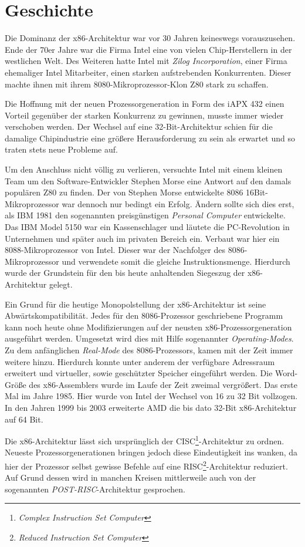 \section{Geschichte}

Die Dominanz der x86-Architektur war vor 30 Jahren keineswegs vorauszusehen.
Ende der 70er Jahre war die Firma Intel eine von vielen Chip-Herstellern in der westlichen Welt.
Des Weiteren hatte Intel mit \emph{Zilog Incorporation}, einer Firma ehemaliger Intel Mitarbeiter, einen starken aufstrebenden Konkurrenten.
Dieser machte ihnen mit ihrem 8080-Mikroprozessor-Klon Z80 stark zu schaffen.

Die Hoffnung mit der neuen Prozessorgeneration in Form des iAPX 432 einen Vorteil gegenüber der starken Konkurrenz zu gewinnen, musste immer wieder verschoben werden.
Der Wechsel auf eine 32-Bit-Architektur schien für die damalige Chipindustrie eine größere Herausforderung zu sein als erwartet und so traten stets neue Probleme auf.

Um den Anschluss nicht völlig zu verlieren, versuchte Intel mit einem kleinen Team um den Software-Entwickler Stephen Morse eine Antwort auf den damals populären Z80 zu finden.
Der von Stephen Morse entwickelte 8086 16Bit-Mikroprozessor war dennoch nur bedingt ein Erfolg.
Ändern sollte sich dies erst, als IBM 1981 den sogenannten preisgünstigen \textit{Personal Computer} entwickelte. Das IBM Model 5150 war ein Kassenschlager und läutete die PC-Revolution in Unternehmen und später auch im privaten Bereich ein.
Verbaut war hier ein 8088-Mikroprozessor von Intel. Dieser war der Nachfolger des 8086-Mikroprozessor und verwendete somit die gleiche Instruktionsmenge.
Hierdurch wurde der Grundstein für den bis heute anhaltenden Siegeszug der x86-Architektur gelegt.\cite{pcworld}

Ein Grund für die heutige Monopolstellung der x86-Architektur ist seine Abwärtskompatibilität.
Jedes für den 8086-Prozessor geschriebene Programm kann noch heute ohne Modifizierungen auf der neusten x86-Prozessorgeneration ausgeführt werden.
Umgesetzt wird dies mit Hilfe sogenannter \textit{Operating-Modes}. Zu dem anfänglichen \textit{Real-Mode} des 8086-Prozessors, kamen mit der Zeit immer weitere hinzu.
Hierdurch konnte unter anderem der verfügbare Adressraum erweitert und virtueller, sowie geschützter Speicher eingeführt werden.
Die Word-Größe des x86-Assemblers wurde im Laufe der Zeit zweimal vergrößert. Das erste Mal im Jahre 1985. Hier wurde von Intel der Wechsel von 16 zu 32 Bit vollzogen. In den Jahren 1999 bis 2003 erweiterte AMD die bis dato 32-Bit x86-Architektur auf 64 Bit.

Die x86-Architektur lässt sich ursprünglich der CISC\footnote{\textit{Complex Instruction Set Computer}}-Architektur zu ordnen.
Neueste Prozessorgenerationen bringen jedoch diese Eindeutigkeit ins wanken, da hier der Prozessor selbst gewisse Befehle auf eine RISC\footnote{\textit{Reduced Instruction Set Computer}}-Architektur  reduziert.
Auf Grund dessen wird in manchen Kreisen mittlerweile auch von der sogenannten \textit{POST-RISC}-Architektur gesprochen. \cite{postrisc}
